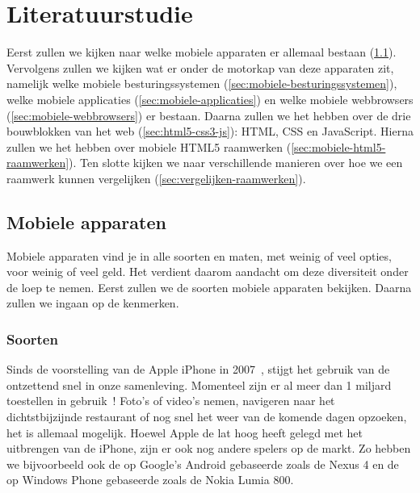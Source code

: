 
\chapter{Literatuurstudie}
\label{hoofdstuk:2}
Eerst zullen we kijken naar welke mobiele apparaten er allemaal bestaan (\ref{sec:mobiele-apparaten}). Vervolgens zullen we kijken wat er onder de motorkap van deze apparaten zit, namelijk welke mobiele besturingssystemen (\ref{sec:mobiele-besturingssystemen}), welke mobiele applicaties (\ref{sec:mobiele-applicaties}) en welke mobiele webbrowsers (\ref{sec:mobiele-webbrowsers}) er bestaan. Daarna zullen we het hebben over de drie bouwblokken van het web (\ref{sec:html5-css3-js}):  HTML,  CSS en JavaScript. Hierna zullen we het hebben over mobiele HTML5 raamwerken (\ref{sec:mobiele-html5-raamwerken}).  Ten slotte kijken we naar verschillende manieren over hoe we een raamwerk kunnen vergelijken (\ref{sec:vergelijken-raamwerken}).


\section{Mobiele apparaten}
\label{sec:mobiele-apparaten}
Mobiele apparaten vind je in alle soorten en maten, met weinig of veel opties, voor weinig of veel geld. Het verdient daarom aandacht om deze diversiteit onder de loep te nemen. Eerst zullen we de soorten mobiele apparaten bekijken. Daarna zullen we ingaan op de kenmerken.

\subsection{Soorten}
Sinds de voorstelling van de Apple iPhone in 2007~\cite{David2011}, stijgt het gebruik van de  ontzettend snel in onze samenleving.  Momenteel zijn er al meer dan 1 miljard toestellen in gebruik~\cite{Yang2012}! Foto's of video's nemen, navigeren naar het dichtstbijzijnde restaurant of nog snel het weer van de komende dagen opzoeken, het is allemaal mogelijk. Hoewel Apple de lat hoog heeft gelegd met het uitbrengen van de iPhone, zijn er ook nog andere spelers op de markt. Zo hebben we bijvoorbeeld ook de op Google's Android gebaseerde  zoals de Nexus 4 en de op Windows Phone gebaseerde  zoals de Nokia Lumia 800.

